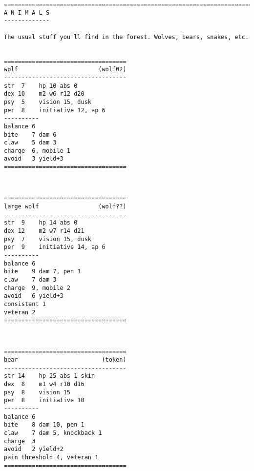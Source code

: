 \goodbreak
\raggedbottom
{}

\goodbreak \begin{samepage} \small \begin{verbatim}
================================================================================
A N I M A L S
-------------

The usual stuff you'll find in the forest. Wolves, bears, snakes, etc.


===================================
wolf                       (wolf02)
-----------------------------------
str  7    hp 10 abs 0
dex 10    m2 w6 r12 d20
psy  5    vision 15, dusk
per  8    initiative 12, ap 6
----------
balance 6
bite    7 dam 6
claw    5 dam 3
charge  6, mobile 1
avoid   3 yield+3
===================================
\end{verbatim} \normalsize \end{samepage}

\

\begin{samepage} \small \begin{verbatim}
===================================
large wolf                 (wolf??)
-----------------------------------
str  9    hp 14 abs 0
dex 12    m2 w7 r14 d21
psy  7    vision 15, dusk
per  9    initiative 14, ap 6
----------
balance 6
bite    9 dam 7, pen 1
claw    7 dam 3
charge  9, mobile 2
avoid   6 yield+3
consistent 1
veteran 2
===================================
\end{verbatim} \normalsize \end{samepage}

\

\goodbreak \begin{samepage} \small \begin{verbatim}
===================================
bear                        (token)
-----------------------------------
str 14    hp 25 abs 1 skin
dex  8    m1 w4 r10 d16
psy  8    vision 15
per  8    initiative 10
----------
balance 6
bite    8 dam 10, pen 1
claw    7 dam 5, knockback 1
charge  3
avoid   2 yield+2
pain threshold 4, veteran 1
===================================
\end{verbatim} \normalsize \end{samepage}

\


